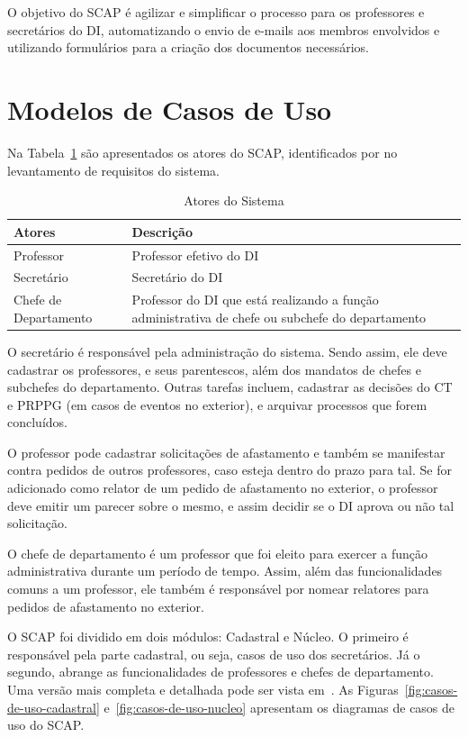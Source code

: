 O objetivo do SCAP é agilizar e simplificar o processo para os professores
e secretários do DI, automatizando o envio de e-mails aos membros envolvidos
e utilizando formulários para a criação dos documentos necessários.


\section{Modelos de Casos de Uso}
\label{sec-espec-casos-uso}

Na Tabela~\ref{tab:atores} são apresentados os atores do SCAP, identificados
por  no levantamento de requisitos do sistema.

\begin{table}[h!]
    \centering
    \caption{Atores do Sistema}
    \label{tab:atores}
    \begin{tabular}{|p{5cm}|p{10cm}|}
    \hline
    \textbf{Atores} & \textbf{Descrição}\\ \hline
    Professor & Professor efetivo do DI \\ \hline
    Secretário & Secretário do DI \\ \hline
    Chefe de Departamento & Professor do DI que está realizando a função administrativa de chefe ou subchefe do departamento  \\ \hline
    \end{tabular}
\end{table}

O secretário é responsável pela administração do sistema. Sendo assim,
ele deve cadastrar os professores, e seus parentescos, além dos mandatos
de chefes e subchefes do departamento. Outras tarefas incluem, cadastrar
as decisões do CT e PRPPG (em casos de eventos no exterior), e arquivar
processos que forem concluídos.

O professor pode cadastrar solicitações de afastamento e também se manifestar
contra pedidos de outros professores, caso esteja dentro do prazo para tal.
Se for adicionado como relator de um pedido de afastamento no exterior,
o professor deve emitir um parecer sobre o mesmo, e assim decidir se o
DI aprova ou não tal solicitação.

O chefe de departamento é um professor que foi eleito para exercer a função
administrativa durante um período de tempo. Assim, além das funcionalidades
comuns a um professor, ele também é responsável por nomear relatores
para pedidos de afastamento no exterior.


O SCAP foi dividido em dois módulos: Cadastral e Núcleo. O primeiro é responsável pela parte
cadastral, ou seja, casos de uso dos secretários. Já o segundo, abrange
as funcionalidades de professores e chefes de departamento. Uma versão mais
completa e detalhada pode ser vista em~\cite{duarte:2014,prado:2015}.
As Figuras~\ref{fig:casos-de-uso-cadastral} e~\ref{fig:casos-de-uso-nucleo} apresentam
os diagramas de casos de uso do SCAP.

